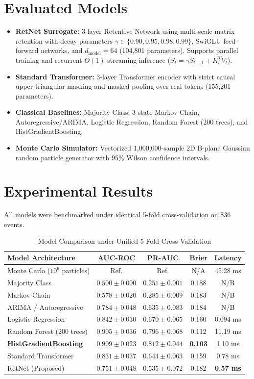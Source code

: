 \documentclass[conference]{IEEEtran}
\begin{document}
\section{Evaluated Models}
\begin{itemize}
    \item \textbf{RetNet Surrogate:} 3-layer Retentive Network using multi-scale matrix retention with decay parameters $\gamma \in \{0.90, 0.95, 0.98, 0.99\}$, SwiGLU feed-forward networks, and $d_{\text{model}} = 64$ (104,801 parameters). Supports parallel training and recurrent $O(1)$ streaming inference ($S_t = \gamma S_{t-1} + K_t^T V_t$).
    \item \textbf{Standard Transformer:} 3-layer Transformer encoder with strict causal upper-triangular masking and masked pooling over real tokens (155,201 parameters).
    \item \textbf{Classical Baselines:} Majority Class, 3-state Markov Chain, Autoregressive/ARIMA, Logistic Regression, Random Forest (200 trees), and HistGradientBoosting.
    \item \textbf{Monte Carlo Simulator:} Vectorized 1,000,000-sample 2D B-plane Gaussian random particle generator with 95\% Wilson confidence intervals.
\end{itemize}

\section{Experimental Results}
All models were benchmarked under identical 5-fold cross-validation on 836 events.

\begin{table}[htbp]
\caption{Model Comparison under Unified 5-Fold Cross-Validation}
\begin{center}
\begin{tabular}{lcccc}
\toprule
\textbf{Model Architecture} & \textbf{AUC-ROC} & \textbf{PR-AUC} & \textbf{Brier} & \textbf{Latency} \\
\midrule
Monte Carlo ($10^6$ particles) & Ref. & Ref. & N/A & 45.28 ms \\
Majority Class & $0.500 \pm 0.000$ & $0.251 \pm 0.001$ & 0.188 & N/B \\
Markov Chain & $0.578 \pm 0.020$ & $0.285 \pm 0.009$ & 0.183 & N/B \\
ARIMA / Autoregressive & $0.784 \pm 0.048$ & $0.635 \pm 0.083$ & 0.184 & N/B \\
Logistic Regression & $0.842 \pm 0.030$ & $0.670 \pm 0.065$ & 0.160 & 0.094 ms \\
Random Forest (200 trees) & $0.905 \pm 0.036$ & $0.796 \pm 0.068$ & 0.112 & 11.19 ms \\
\textbf{HistGradientBoosting} & $\mathbf{0.909 \pm 0.023}$ & $\mathbf{0.812 \pm 0.044}$ & \textbf{0.103} & 1.10 ms \\
Standard Transformer & $0.831 \pm 0.037$ & $0.644 \pm 0.063$ & 0.159 & 0.78 ms \\
RetNet (Proposed) & $0.751 \pm 0.048$ & $0.535 \pm 0.072$ & 0.182 & \textbf{0.57 ms} \\
\bottomrule
\end{tabular}
\end{center}
\end{table}
\end{document}
